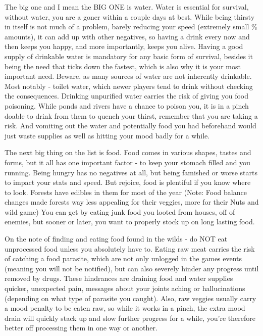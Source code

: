 \documentclass[11pt]{report}
\begin{document}
The big one and I mean the BIG ONE is water. Water is essential for survival, without water, you are a goner within a couple days at best. While being thirsty in itself is not much of a problem, barely reducing your speed (extremely small \% amounts), it can add up with other negatives, so having a drink every now and then keeps you happy, and more importantly, keeps you alive. Having a good supply of drinkable water is mandatory for any basic form of survival, besides it being the need that ticks down the fastest, which is also why it is your most important need. Beware, as many sources of water are not inherently drinkable. Most notably - toilet water, which newer players tend to drink without checking the consequences. Drinking unpurified water carries the risk of giving you food poisoning. While ponds and rivers have a chance to poison you, it is in a pinch doable to drink from them to quench your thirst, remember that you are taking a risk. And vomiting out the water and potentially food you had beforehand would just waste supplies as well as hitting your mood badly for a while.

The next big thing on the list is food. Food comes in various shapes, tastes and forms, but it all has one important factor - to keep your stomach filled and you running. Being hungry has no negatives at all, but being famished or worse starts to impact your stats and speed. But rejoice, food is plentiful if you know where to look. Forests have edibles in them for most of the year (Note: Food balance changes made forests way less appealing for their veggies, more for their Nuts and wild game) You can get by eating junk food you looted from houses, off of enemies, but sooner or later, you want to properly stock up on long lasting food.

On the note of finding and eating food found in the wilds - do NOT eat unprocessed food unless you absolutely have to. Eating raw meat carries the risk of catching a food parasite, which are not only unlogged in the games events (meaning you will not be notified), but can also severely hinder any progress until removed by drugs. These hindrances are draining food and water supplies quicker, unexpected pain, messages about your joints aching or hallucinations (depending on what type of parasite you caught). Also, raw veggies usually carry a mood penalty to be eaten raw, so while it works in a pinch, the extra mood drain will quickly stack up and slow further progress for a while, you're therefore better off processing them in one way or another.
\end{document}
